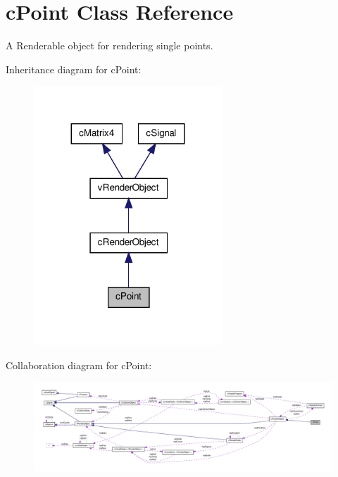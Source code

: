 \hypertarget{classc_point}{
\section{cPoint Class Reference}
\label{classc_point}
}


A Renderable object for rendering single points.  




Inheritance diagram for cPoint:
\nopagebreak
\begin{figure}[H]
\begin{center}
\leavevmode
\includegraphics[width=200pt]{classc_point__inherit__graph}
\end{center}
\end{figure}


Collaboration diagram for cPoint:
\nopagebreak
\begin{figure}[H]
\begin{center}
\leavevmode
\includegraphics[width=400pt]{classc_point__coll__graph}
\end{center}
\end{figure}

